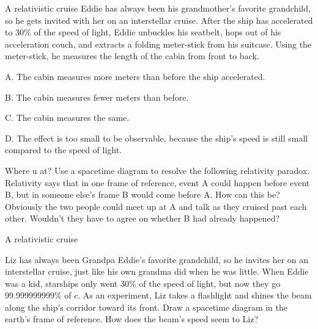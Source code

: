 \begin{frame}{A relativistic cruise}
Eddie has always been his grandmother's favorite grandchild, so he
gets invited with her on an interstellar cruise. After the ship has accelerated
to 30\%
of the speed of light, Eddie unbuckles his seatbelt, hops out of his acceleration
couch, and extracts a folding meter-stick from his suitcase. Using the meter-stick,
he measures the length of the cabin from front to back.

\vspace{20mm}

A. The cabin measures more meters than before the ship accelerated.

B. The cabin measures fewer meters than before.

C. The cabin measures the same.

D. The effect is too small to be observable, because the ship's speed is still small compared
to the speed of light.
\end{frame}


\begin{frame}{Where u at?}
Use a spacetime diagram to resolve the following relativity paradox. Relativity
        says that in one frame of reference, event A could happen before event
        B, but in someone else's frame B would come before A. How can this be?
        Obviously the two people could meet up at A and talk as they cruised
        past each other. Wouldn't they have to agree on whether B had already
        happened?
\end{frame}

\begin{frame}{A relativistic cruise}

Liz has always been Grandpa Eddie's favorite grandchild, so he invites her
on an interstellar cruise, just like his own grandma did when he was little.
When Eddie was a kid, starships
only went
30\%
of the speed of light, but now they go 99.999999999\%
of $c$. As an experiment, Liz takes a flashlight and shines the beam along the ship's corridor
toward its front. Draw a spacetime diagram in the earth's frame of reference.
How does the beam's speed seem to Liz?

\end{frame}


